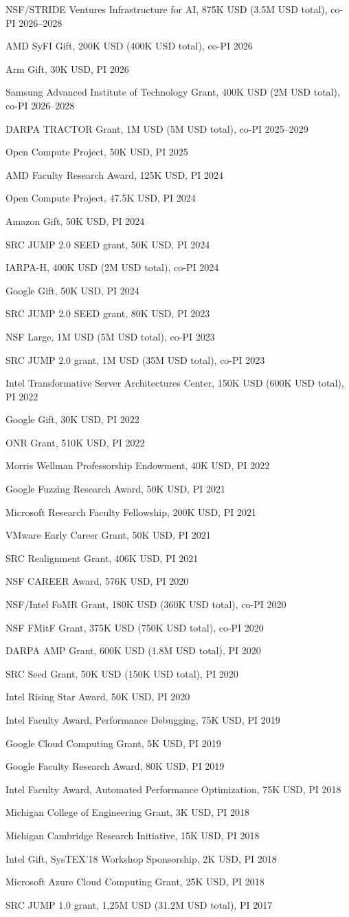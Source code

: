 \documentclass[10pt]{article}
\newcommand{\fundline}[1]{\hspace*{2mm}#1\par}
\begin{document}
\fundline{NSF/STRIDE Ventures Infrastructure for AI, 875K USD (3.5M USD total), co-PI \hfill 2026--2028}
\fundline{AMD SyFI Gift, 200K USD (400K USD total), co-PI \hfill 2026}
\fundline{Arm Gift, 30K USD, PI \hfill 2026}
\fundline{Samsung Advanced Institute of Technology Grant, 400K USD (2M USD total), co-PI \hfill 2026--2028}
\fundline{DARPA TRACTOR Grant, 1M USD (5M USD total), co-PI \hfill 2025--2029}
\fundline{Open Compute Project, 50K USD, PI \hfill 2025}
\fundline{AMD Faculty Research Award, 125K USD, PI \hfill 2024}
\fundline{Open Compute Project, 47.5K USD, PI \hfill 2024}
\fundline{Amazon Gift, 50K USD, PI \hfill 2024}
\fundline{SRC JUMP 2.0 SEED grant, 50K USD, PI \hfill 2024}
\fundline{IARPA-H, 400K USD (2M USD total), co-PI \hfill 2024}
\fundline{Google Gift, 50K USD, PI \hfill 2024}
\fundline{SRC JUMP 2.0 SEED grant, 80K USD, PI \hfill 2023}
\fundline{NSF Large, 1M USD (5M USD total), co-PI \hfill 2023}
\fundline{SRC JUMP 2.0 grant, 1M USD (35M USD total), co-PI \hfill 2023}
\fundline{Intel Transformative Server Architectures Center, 150K USD (600K USD total), PI \hfill 2022}
\fundline{Google Gift, 30K USD, PI \hfill 2022}
\fundline{ONR Grant, 510K USD, PI \hfill 2022}
\fundline{Morris Wellman Professorship Endowment, 40K USD, PI \hfill 2022}
\fundline{Google Fuzzing Research Award, 50K USD, PI \hfill 2021}
\fundline{Microsoft Research Faculty Fellowship, 200K USD, PI \hfill 2021}
\fundline{VMware Early Career Grant, 50K USD, PI \hfill 2021}
\fundline{SRC Realignment Grant, 406K USD, PI \hfill 2021}
\fundline{NSF CAREER Award, 576K USD, PI \hfill 2020}
\fundline{NSF/Intel FoMR Grant, 180K USD (360K USD total), co-PI \hfill 2020}
\fundline{NSF FMitF Grant, 375K USD (750K USD total), co-PI \hfill 2020}
\fundline{DARPA AMP Grant, 600K USD (1.8M USD total), PI \hfill 2020}
\fundline{SRC Seed Grant, 50K USD (150K USD total), PI \hfill 2020}
\fundline{Intel Rising Star Award, 50K USD, PI \hfill 2020}
\fundline{Intel Faculty Award, Performance Debugging, 75K USD, PI \hfill 2019}
\fundline{Google Cloud Computing Grant, 5K USD, PI \hfill 2019}
\fundline{Google Faculty Research Award, 80K USD, PI \hfill 2019}
\fundline{Intel Faculty Award, Automated Performance Optimization, 75K USD, PI \hfill 2018}
\fundline{Michigan College of Engineering Grant, 3K USD, PI \hfill 2018}
\fundline{Michigan Cambridge Research Initiative, 15K USD, PI \hfill 2018}
\fundline{Intel Gift, SysTEX'18 Workshop Sponsorship, 2K USD, PI \hfill 2018}
\fundline{Microsoft Azure Cloud Computing Grant, 25K USD, PI \hfill 2018}
\fundline{SRC JUMP 1.0 grant, 1,25M USD (31.2M USD total), PI \hfill 2017}
\end{document}
